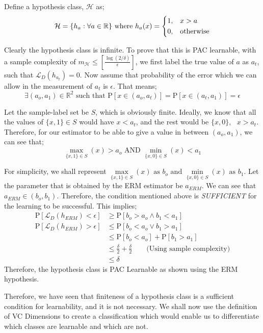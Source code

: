 \begin{example}
Define a hypothesis class, $\mathcal{H}$ as; 
$$\mathcal{H} = \{ h_a : \forall a \in \mathbb{R} \}\text{ where }
    h_a(x) = 
    \begin{dcases}
        1, &x>a\\
        0, &\text{otherwise}\\
    \end{dcases}
$$

Clearly the hypothesis class is infinite. To prove that this is PAC learnable, with a sample complexity of $m_\mathcal{H}\leq \left[ \frac{\log(2/\delta)}{\epsilon} \right]$, we first label the true value of $a$ as $a_t$, such that $\mathcal{L}_D(h_{a_t})=0$. Now assume that probability of the error which we can allow in the measurement of $a_t$ is $\epsilon$. That means;
$$
    \exists (a_o, a_1)\in\mathbb{R}^2 \text{ such that } \text{P}[x\in(a_o,a_t)] = \text{P}[x\in(a_t,a_1)] = \epsilon 
$$

Let the sample-label set be $S$, which is obviously finite. Ideally, we know that all the values of $\{x,1\}\in S$ would have $x<a_t$, and the rest would be $\{x,0\},\text{ }x>a_t$. Therefore, for our estimator to be able to give a value in between $(a_o,a_1)$, we can see that;
$$
    \max\limits_{\{x,1\}\in S}(x)>a_o \text{ AND } \min\limits_{\{x,0\}\in S}(x)<a_1
$$

For simplicity, we shall represent $\max\limits_{\{x,1\}\in S}(x) \text{ as } b_o\text{ and }\min\limits_{\{x,0\}\in S}(x)\text{ as }b_1$. Let the parameter that is obtained by the ERM estimator be $a_{ERM}$. We can see that $a_{ERM}\in (b_o,b_1)$. Therefore, the condition mentioned above is \emph{SUFFICIENT} for the learning to be successful. This implies;
\begin{align*}
    \text{P}[\mathcal{L}_D(h_{ERM})<\epsilon] &\geq \text{P}[b_o>a_o \wedge b_1<a_1]\\
    \text{P}[\mathcal{L}_D(h_{ERM})>\epsilon] &\leq \text{P}[b_o<a_o \lor b_1>a_1]\\
    &\leq \text{P}[b_o<a_o]+\text{P}[b_1>a_1]\\
    &\leq \frac{\delta}{2} + \frac{\delta}{2} \qquad \text{(Using sample complexity)}\\
    &\leq \delta
\end{align*}
Therefore, the hypothesis class is PAC Learnable as shown using the ERM hypothesis.
\end{example}

Therefore, we have seen that finiteness of a hypothesis class is a sufficient condition for learnability, and it is not necessary. We shall now use the definition of VC Dimensions to create a classification which would enable us to differentiate which classes are learnable and which are not.\\
